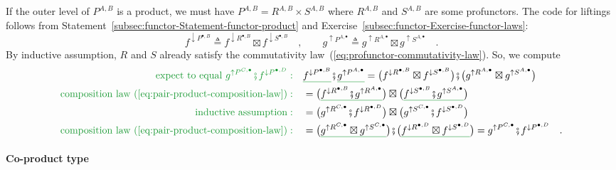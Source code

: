 If the outer level of $P^{A,B}$ is a product, we must have $P^{A,B}=R^{A,B}\times S^{A,B}$
where $R^{A,B}$ and $S^{A,B}$ are some profunctors. The code for
liftings follows from Statement~\ref{subsec:functor-Statement-functor-product}
and Exercise~\ref{subsec:functor-Exercise-functor-laws}:
\[
f^{\downarrow P^{\bullet,B}}\triangleq f^{\downarrow R^{\bullet,B}}\boxtimes f^{\downarrow S^{\bullet,B}}\quad,\quad\quad g^{\uparrow P^{A,\bullet}}\triangleq g^{\uparrow R^{A,\bullet}}\boxtimes g^{\uparrow S^{A,\bullet}}\quad.
\]
By inductive assumption, $R$ and $S$ already satisfy the commutativity
law~(\ref{eq:profunctor-commutativity-law}). So, we compute
\begin{align*}
{\color{greenunder}\text{expect to equal }g^{\uparrow P^{C,\bullet}}\bef f^{\downarrow P^{\bullet,D}}:}\quad & \gunderline{f^{\downarrow P^{\bullet,B}}}\bef\gunderline{g^{\uparrow P^{A,\bullet}}}=\big(f^{\downarrow R^{\bullet,B}}\boxtimes f^{\downarrow S^{\bullet,B}}\big)\bef\big(g^{\uparrow R^{A,\bullet}}\boxtimes g^{\uparrow S^{A,\bullet}}\big)\\
{\color{greenunder}\text{composition law~(\ref{eq:pair-product-composition-law})}:}\quad & =\big(\gunderline{f^{\downarrow R^{\bullet,B}}\bef g^{\uparrow R^{A,\bullet}}}\big)\boxtimes\big(\gunderline{f^{\downarrow S^{\bullet,B}}\bef g^{\uparrow S^{A,\bullet}}}\big)\\
{\color{greenunder}\text{inductive assumption}:}\quad & =\big(g^{\uparrow R^{C,\bullet}}\bef f^{\downarrow R^{\bullet,D}}\big)\boxtimes\big(g^{\uparrow S^{C,\bullet}}\bef f^{\downarrow S^{\bullet,D}}\big)\\
{\color{greenunder}\text{composition law~(\ref{eq:pair-product-composition-law})}:}\quad & =\big(\gunderline{g^{\uparrow R^{C,\bullet}}\boxtimes g^{\uparrow S^{C,\bullet}}}\big)\bef\big(\gunderline{f^{\downarrow R^{\bullet,D}}\boxtimes f^{\downarrow S^{\bullet,D}}}\big)=g^{\uparrow P^{C,\bullet}}\bef f^{\downarrow P^{\bullet,D}}\quad.
\end{align*}


\paragraph{Co-product type}

